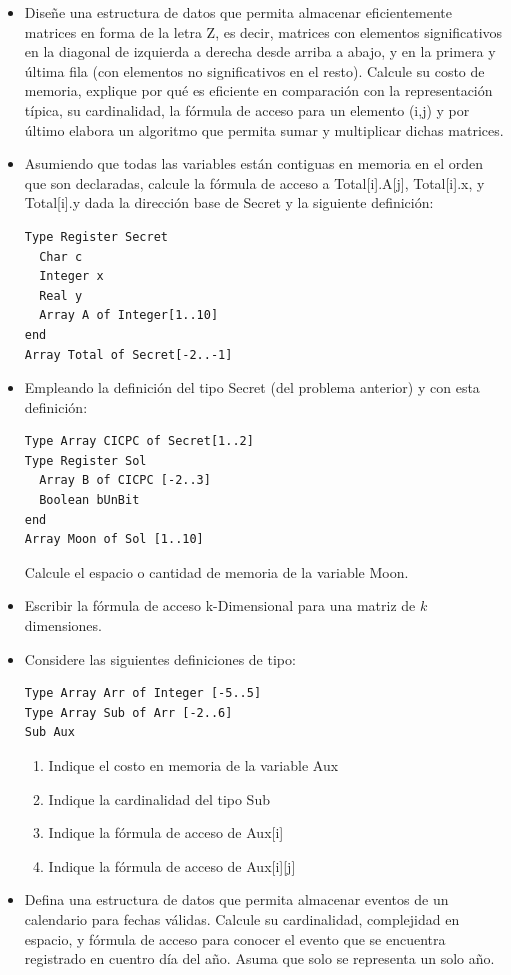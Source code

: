 \begin{itemize}
\item Diseñe una estructura de datos que permita almacenar eficientemente matrices en forma de la letra Z, es decir, matrices con elementos significativos en la diagonal de izquierda a derecha desde arriba a abajo, y en la primera y última fila (con elementos no significativos en el resto). Calcule su costo de memoria, explique por qué es eficiente en comparación con la representación típica, su cardinalidad, la fórmula de acceso para un elemento (i,j) y por último elabora un algoritmo que permita sumar y multiplicar dichas matrices.
\item Asumiendo que todas las variables están contiguas en memoria en el orden que son declaradas, calcule la fórmula de acceso a Total[i].A[j], Total[i].x, y Total[i].y dada la dirección base de Secret y la siguiente definición:
\begin{lstlisting}[upquote=true, language=pseudo]
Type Register Secret
  Char c
  Integer x
  Real y
  Array A of Integer[1..10]
end
Array Total of Secret[-2..-1]
\end{lstlisting}
\item Empleando la definición del tipo Secret (del problema anterior) y con esta definición:
\begin{lstlisting}[upquote=true, language=pseudo]
Type Array CICPC of Secret[1..2]
Type Register Sol
  Array B of CICPC [-2..3]
  Boolean bUnBit
end
Array Moon of Sol [1..10]
\end{lstlisting}
Calcule el espacio o cantidad de memoria de la variable Moon.
\item Escribir la fórmula de acceso k-Dimensional para una matriz de $k$ dimensiones.
\item Considere las siguientes definiciones de tipo:
\begin{lstlisting}[upquote=true, language=pseudo]
Type Array Arr of Integer [-5..5]
Type Array Sub of Arr [-2..6]
Sub Aux
\end{lstlisting}
\begin{enumerate}
\item Indique el costo en memoria de la variable Aux
\item Indique la cardinalidad del tipo Sub
\item Indique la fórmula de acceso de Aux[i]
\item Indique la fórmula de acceso de Aux[i][j]
\end{enumerate}
\item Defina una estructura de datos que permita almacenar eventos de un calendario para fechas válidas. Calcule su cardinalidad, complejidad en espacio, y fórmula de acceso para conocer el evento que se encuentra registrado en cuentro día del año. Asuma que solo se representa un solo año.
\end{itemize}



